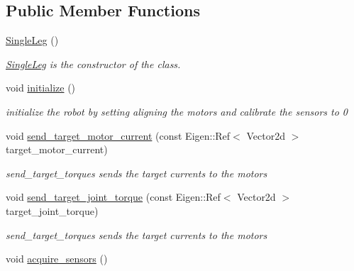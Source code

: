 \subsection*{Public Member Functions}
\begin{DoxyCompactItemize}
\item 
\hyperlink{classblmc__robots_1_1SingleLeg_a1b1ef6964010aa2042b042ff3d5d864f}{Single\+Leg} ()
\begin{DoxyCompactList}\small\item\em \hyperlink{classblmc__robots_1_1SingleLeg}{Single\+Leg} is the constructor of the class. \end{DoxyCompactList}\item 
\mbox{\label{classblmc__robots_1_1SingleLeg_a28891a4273cdcabc67bfd04dae75e8db}} 
void \hyperlink{classblmc__robots_1_1SingleLeg_a28891a4273cdcabc67bfd04dae75e8db}{initialize} ()
\begin{DoxyCompactList}\small\item\em initialize the robot by setting aligning the motors and calibrate the sensors to 0 \end{DoxyCompactList}\item 
\mbox{\label{classblmc__robots_1_1SingleLeg_ac68163f459be877af9fb78f348729f9b}} 
void \hyperlink{classblmc__robots_1_1SingleLeg_ac68163f459be877af9fb78f348729f9b}{send\+\_\+target\+\_\+motor\+\_\+current} (const Eigen\+::\+Ref$<$ Vector2d $>$ target\+\_\+motor\+\_\+current)
\begin{DoxyCompactList}\small\item\em send\+\_\+target\+\_\+torques sends the target currents to the motors \end{DoxyCompactList}\item 
\mbox{\label{classblmc__robots_1_1SingleLeg_a0525a29e9b76527936525ca0e47cafe0}} 
void \hyperlink{classblmc__robots_1_1SingleLeg_a0525a29e9b76527936525ca0e47cafe0}{send\+\_\+target\+\_\+joint\+\_\+torque} (const Eigen\+::\+Ref$<$ Vector2d $>$ target\+\_\+joint\+\_\+torque)
\begin{DoxyCompactList}\small\item\em send\+\_\+target\+\_\+torques sends the target currents to the motors \end{DoxyCompactList}\item 
void \hyperlink{classblmc__robots_1_1SingleLeg_a093a696ad34f00e92adcc4eb282a37d9}{acquire\+\_\+sensors} ()

\end{DoxyCompactItemize}
